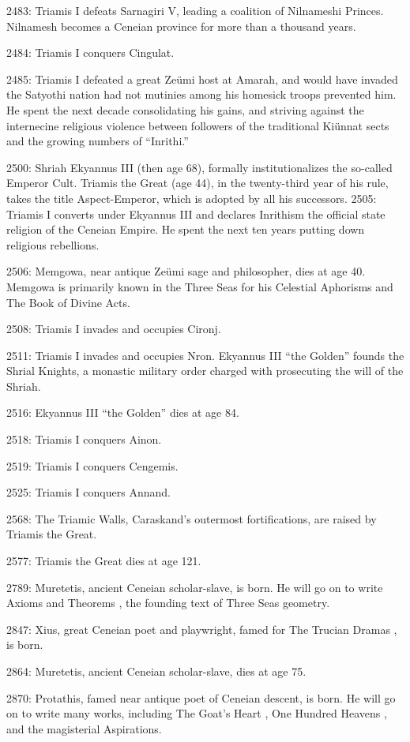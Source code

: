 \documentclass[]{book}
\begin{document}
2483: Triamis I defeats Sarnagiri V, leading a coalition of Nilnameshi Princes.
Nilnamesh becomes a Ceneian province for more than a thousand years.

2484: Triamis I conquers Cingulat.

2485: Triamis I defeated a great Zeümi host at Amarah, and would have invaded the
Satyothi nation had not mutinies among his homesick troops prevented him.
He spent the next decade consolidating his gains, and striving against the
internecine religious violence between followers of the traditional Kiünnat sects
and the growing numbers of ``Inrithi.''

2500: Shriah Ekyannus III (then age 68), formally institutionalizes the so-called
Emperor Cult. Triamis the Great (age 44), in the twenty-third year of his rule,
takes the title Aspect-Emperor, which is adopted by all his successors.
2505: Triamis I converts under Ekyannus III and declares Inrithism the official state
religion of the Ceneian Empire. He spent the next ten years putting down
religious rebellions.

2506: Memgowa, near antique Zeümi sage and philosopher, dies at age 40. Memgowa
is primarily known in the Three Seas for his Celestial Aphorisms and The Book
of Divine Acts.

2508: Triamis I invades and occupies Cironj.

2511: Triamis I invades and occupies Nron. Ekyannus III ``the Golden'' founds
the Shrial Knights, a monastic military order charged with prosecuting the will
of the Shriah.

2516: Ekyannus III ``the Golden'' dies at age 84.

2518: Triamis I conquers Ainon.

2519: Triamis I conquers Cengemis.

2525: Triamis I conquers Annand.

2568: The Triamic Walls, Caraskand's outermost fortifications, are raised by Triamis
the Great.

2577: Triamis the Great dies at age 121.

2789: Muretetis, ancient Ceneian scholar-slave, is born. He will go on to write Axioms
and Theorems , the founding text of Three Seas geometry.

2847: Xius, great Ceneian poet and playwright, famed for The Trucian Dramas , is
born.

2864: Muretetis, ancient Ceneian scholar-slave, dies at age 75.

2870: Protathis, famed near antique poet of Ceneian descent, is born. He will go on
to write many works, including The Goat's Heart , One Hundred Heavens , and
the magisterial Aspirations.
\end{document}
